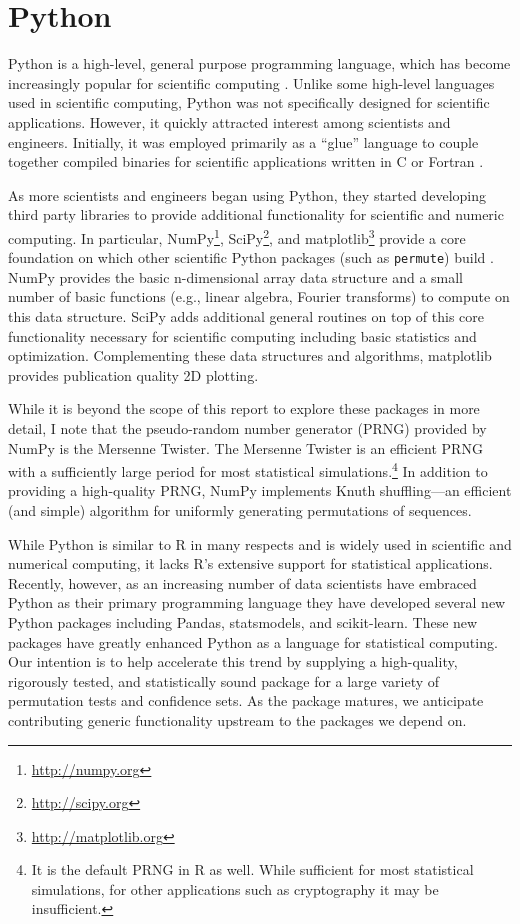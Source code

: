 \section{Python}

Python is a high-level, general purpose programming language, which has become
increasingly popular for scientific computing \cite{millman2011python,
Perez2011}. Unlike some high-level languages used in scientific computing,
Python was not specifically designed for scientific applications.  However, it
quickly attracted interest among scientists and engineers.  Initially, it was
employed primarily as a ``glue'' language to couple together compiled binaries
for scientific applications written in C or Fortran \cite{dubois2007guest}.

As more scientists and engineers began using Python, they started developing
third party libraries to provide additional functionality for scientific and
numeric computing.  In particular, NumPy\footnote{\url{http://numpy.org}},
SciPy\footnote{\url{http://scipy.org}}, and
matplotlib\footnote{\url{http://matplotlib.org}} provide a core foundation on
which other scientific Python packages (such as \texttt{permute}) build 
\cite{oliphant2007python, van2011numpy, hunter2007matplotlib}. NumPy
provides the basic n-dimensional array data structure and a small number of
basic functions (e.g., linear algebra, Fourier transforms) to compute on this data
structure.  SciPy adds additional general routines on top of this core
functionality necessary for scientific computing including basic statistics and
optimization.  Complementing these data structures and algorithms, matplotlib
provides publication quality 2D plotting.  

While it is beyond the scope of this report to explore these packages in more
detail, I note that the pseudo-random number generator (PRNG) provided by NumPy
is the Mersenne Twister.  The Mersenne Twister is an efficient PRNG with a
sufficiently large period for most statistical simulations.\footnote{It is the
default PRNG in R as well.  While sufficient for most statistical simulations,
for other applications such as cryptography it may be insufficient.}  In
addition to providing a high-quality PRNG, NumPy implements Knuth
shuffling---an efficient (and simple) algorithm for uniformly generating
permutations of sequences.

While Python is similar to R in many respects and is widely used in scientific
and numerical computing, it lacks R's extensive support for statistical
applications.  Recently, however, as an increasing number of data scientists
have embraced Python as their primary programming language they have developed
several new Python packages including Pandas, statsmodels, and
scikit-learn.  These new packages have greatly enhanced Python as a language for
statistical computing.  Our intention is to help accelerate this trend by supplying a
high-quality, rigorously tested, and statistically sound package for a large
variety of permutation tests and confidence sets. As the package matures, we
anticipate contributing generic functionality upstream to the packages we
depend on.

